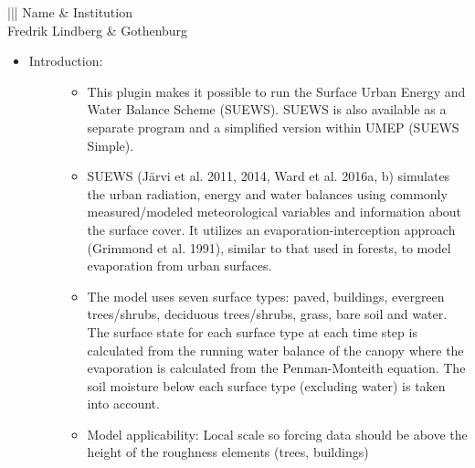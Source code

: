 \documentclass[letterpaper,10pt,english]{sphinxmanual}
\begin{document}
\begin{savenotes}\sphinxattablestart
\centering
\begin{tabular}[t]{|||}
\hline
\sphinxstyletheadfamily 
Name
&\sphinxstyletheadfamily 
Institution
\\
\hline
Fredrik Lindberg
&
Gothenburg
\\
\hline
\end{tabular}
\par
\sphinxattableend\end{savenotes}
\begin{itemize}
\item {} \begin{description}
\item[{Introduction:}] \leavevmode\begin{itemize}
\item {} 
This plugin makes it possible to run the Surface Urban Energy and Water Balance Scheme (SUEWS). SUEWS is also available as a separate program and a simplified version within UMEP (SUEWS Simple).

\item {} 
SUEWS (Järvi et al. 2011, 2014, Ward et al. 2016a, b) simulates the urban radiation, energy and water balances using commonly measured/modeled meteorological variables and information about the surface cover. It utilizes an evaporation-interception approach (Grimmond et al. 1991), similar to that used in forests, to model evaporation from urban surfaces.

\item {} 
The model uses seven surface types: paved, buildings, evergreen trees/shrubs, deciduous trees/shrubs, grass, bare soil and water. The surface state for each surface type at each time step is calculated from the running water balance of the canopy where the evaporation is calculated from the Penman-Monteith equation. The soil moisture below each surface type (excluding water) is taken into account.

\item {} 
Model applicability: Local scale \textendash{} so forcing data should be above the height of the roughness elements (trees, buildings)

\end{itemize}

\end{description}


\end{itemize}
\end{document}

